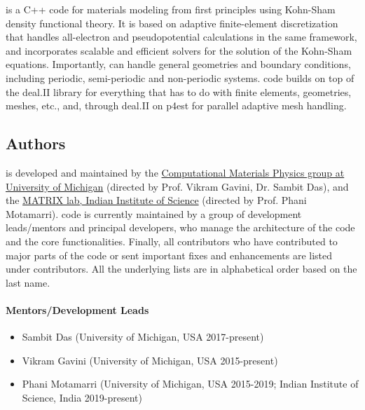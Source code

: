 \dftfe{} is a C++ code for materials modeling from first principles using Kohn-Sham density functional theory.
It is based on adaptive finite-element discretization that handles all-electron and pseudopotential calculations in the 
same framework, and incorporates scalable and efficient solvers for the solution of the Kohn-Sham equations. Importantly, \dftfe{} 
can handle general geometries and boundary conditions, including periodic, semi-periodic and non-periodic systems. \dftfe{} code 
builds on top of the deal.II library for everything that has to do with finite elements, geometries, meshes, etc., and, through 
deal.II on p4est for parallel adaptive mesh handling.

\subsection{Authors}
\label{sec:authors}
\dftfe{} is developed and maintained by the \href{http://www-personal.umich.edu/~vikramg/}{Computational Materials Physics
group at University of Michigan} (directed by Prof. Vikram Gavini, Dr. Sambit Das), and the \href{https://sites.google.com/view/matrix-lab}{MATRIX lab, Indian Institute of Science} (directed by Prof. Phani Motamarri). \dftfe{} code is currently maintained by a group of development leads/mentors and  principal developers, 
who manage the architecture of the code and the core functionalities. Finally, all contributors who have contributed to major parts
of the \dftfe{} code or sent important fixes and enhancements are listed under contributors. All the underlying 
lists are in alphabetical order based on the last name.

\paragraph{Mentors/Development Leads}
\begin{itemize}
    \item Sambit Das (University of Michigan, USA 2017-present)    
     \item Vikram Gavini (University of Michigan, USA 2015-present)
     \item Phani Motamarri (University of Michigan, USA 2015-2019; Indian Institute of Science, India 2019-present)
\end{itemize}

